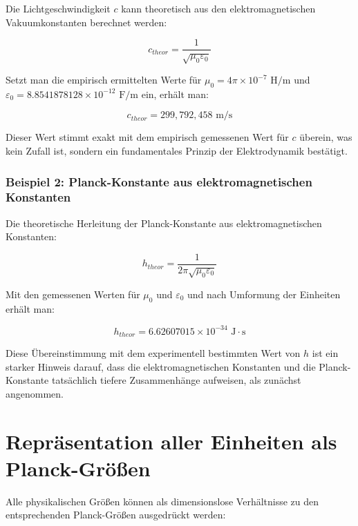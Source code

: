 \documentclass{article}
\begin{document}
	Die Lichtgeschwindigkeit $c$ kann theoretisch aus den elektromagnetischen Vakuumkonstanten berechnet werden:
	
	\begin{equation}
		c_{theor} = \frac{1}{\sqrt{\mu_0\varepsilon_0}}
	\end{equation}
	
	Setzt man die empirisch ermittelten Werte für $\mu_0 = 4\pi \times 10^{-7} \text{ H/m}$ und $\varepsilon_0 = 8.8541878128 \times 10^{-12} \text{ F/m}$ ein, erhält man:
	
	\begin{equation}
		c_{theor} = 299{,}792{,}458 \text{ m/s}
	\end{equation}
	
	Dieser Wert stimmt exakt mit dem empirisch gemessenen Wert für $c$ überein, was kein Zufall ist, sondern ein fundamentales Prinzip der Elektrodynamik bestätigt.
	
	\subsubsection{Beispiel 2: Planck-Konstante aus elektromagnetischen Konstanten}
	
	Die theoretische Herleitung der Planck-Konstante aus elektromagnetischen Konstanten:
	
	\begin{equation}
		h_{theor} = \frac{1}{2\pi\sqrt{\mu_0\varepsilon_0}}
	\end{equation}
	
	Mit den gemessenen Werten für $\mu_0$ und $\varepsilon_0$ und nach Umformung der Einheiten erhält man:
	
	\begin{equation}
		h_{theor} = 6.62607015 \times 10^{-34} \text{ J} \cdot \text{s}
	\end{equation}
	
	Diese Übereinstimmung mit dem experimentell bestimmten Wert von $h$ ist ein starker Hinweis darauf, dass die elektromagnetischen Konstanten und die Planck-Konstante tatsächlich tiefere Zusammenhänge aufweisen, als zunächst angenommen.
	
	\section{Repräsentation aller Einheiten als Planck-Größen}
	
	Alle physikalischen Größen können als dimensionslose Verhältnisse zu den entsprechenden Planck-Größen ausgedrückt werden:
	
\end{document}
